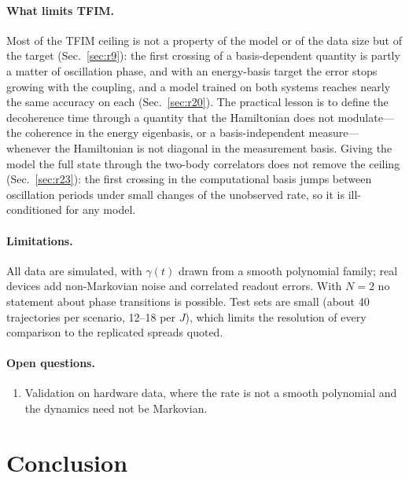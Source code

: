 \documentclass[twocolumn,10pt]{article}
\begin{document}
\paragraph{What limits TFIM.}
Most of the TFIM ceiling is not a property of the model or of the data
size but of the target (Sec.~\ref{sec:r9}): the first crossing of a
basis-dependent quantity is partly a matter of oscillation phase, and
with an energy-basis target the error stops growing with the coupling,
and a model trained on both systems reaches nearly the same accuracy on
each (Sec.~\ref{sec:r20}).
The practical lesson is to define the decoherence time through a
quantity that the Hamiltonian does not modulate---the coherence in the
energy eigenbasis, or a basis-independent measure---whenever the
Hamiltonian is not diagonal in the measurement basis.
Giving the model the full state through the two-body correlators does
not remove the ceiling (Sec.~\ref{sec:r23}): the first crossing in the
computational basis jumps between oscillation periods under small
changes of the unobserved rate, so it is ill-conditioned for any model.

\paragraph{Limitations.}
All data are simulated, with $\gamma(t)$ drawn from a smooth polynomial
family; real devices add non-Markovian noise and correlated readout
errors.
With $N = 2$ no statement about phase transitions is possible.
Test sets are small (about 40 trajectories per scenario, 12--18 per $J$),
which limits the resolution of every comparison to the replicated
spreads quoted.

\paragraph{Open questions.}
\begin{enumerate}
  \item Validation on hardware data, where the rate is not a smooth
    polynomial and the dynamics need not be Markovian.
\end{enumerate}

\section{Conclusion}
\end{document}
